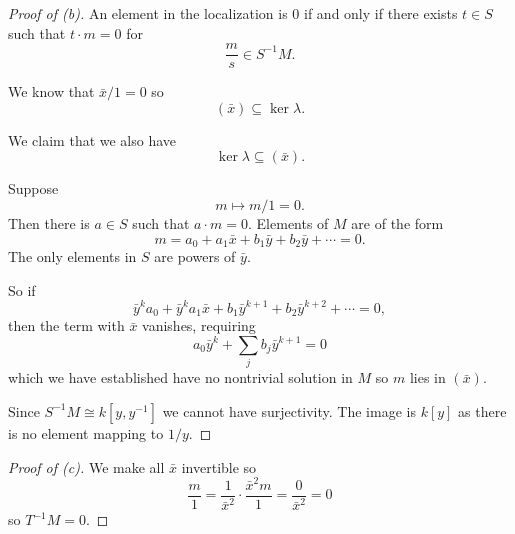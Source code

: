 \documentclass[11pt]{article}
\begin{document}
\begin{proof}[Proof of (b)]
    An element in the localization is $0$ 
    if and only if there exists 
    $t \in S$ such that $t \cdot m = 0$ for 
    \[
        \frac{m}s \in S^{-1}M.
    \] 

    We know that $\bar x / 1 = 0$ so 
    \[
        (\bar x) \subseteq \ker \lambda. 
    \]

    We claim that we also have 
    \[
        \ker \lambda \subseteq (\bar x). 
    \]

    Suppose 
    \[
        m \mapsto m/1 = 0.  
    \]
    Then there is $a \in S$ such that 
    $a \cdot m = 0$. 
    Elements of $M$ are of the form 
    \[
        m = a_0 + a_1 \bar x + b_1 \bar y + 
        b_2 \bar y + \cdots = 0. 
    \]
    The only elements in $S$ are powers of 
    $\bar y$. 

    So if 
    \[
        \bar y^k a_0 + \bar y^k a_1 \bar x + 
        b_1 \bar y^{k+1} + 
        b_2 \bar y^{k+2} + \cdots = 0, 
    \]
    then the term with $\bar x$ vanishes, requiring 
    \[
        a_0 \bar y^k + \sum_j b_j \bar y^{k+1} 
        = 0 
    \]
    which we have established have no nontrivial 
    solution in $M$ so $m$ lies in $(\bar x)$. 

    Since $S^{-1}M \cong k[y, y^{-1}]$ we 
    cannot have surjectivity. The image is $k[y]$ as 
    there is no element mapping to $1/y$.  
\end{proof}
\begin{proof}[Proof of (c)]
    We make all $\bar x$ invertible so 
    \[
        \frac{m}{1} 
        = \frac{1}{\bar x^2} \cdot \frac{\bar x^2m}{1} 
        = \frac{0}{\bar x^2} = 0 
    \]
    so $T^{-1}M = 0$. 


\end{proof}
\end{document}
